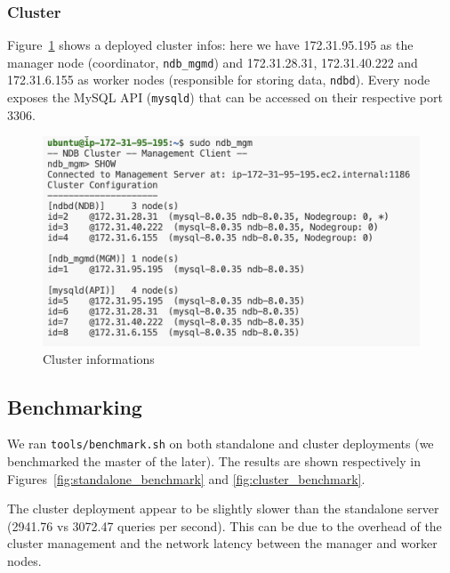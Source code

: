 \documentclass[letterpaper,headings=standardclasses,parskip=half]{scrartcl}
\begin{document}
\subsubsection{Cluster}

Figure~\ref{fig:ndb_mgm} shows a deployed cluster infos: here we have 172.31.95.195 as the manager node (coordinator, \texttt{ndb\_mgmd}) and 172.31.28.31, 172.31.40.222 and 172.31.6.155 as worker nodes (responsible for storing data, \texttt{ndbd}). Every node exposes the MySQL API (\texttt{mysqld}) that can be accessed on their respective port 3306.

\begin{figure}[h]
    \centering
    \includegraphics[width=0.5\linewidth]{figures/Screenshot 2023-12-24 at 21.30.58.png}
    \caption{Cluster informations}
    \label{fig:ndb_mgm}
\end{figure}

\subsection{Benchmarking}

We ran \texttt{tools/benchmark.sh} on both standalone and cluster deployments (we benchmarked the master of the later). The results are shown respectively in Figures~\ref{fig:standalone_benchmark} and \ref{fig:cluster_benchmark}.

The cluster deployment appear to be slightly slower than the standalone server (2941.76 vs 3072.47 queries per second). This can be due to the overhead of the cluster management and the network latency between the manager and worker nodes.
\end{document}
